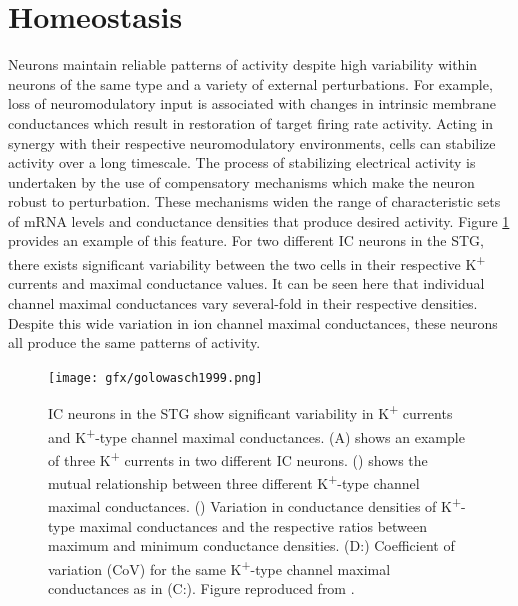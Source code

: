 \section{Homeostasis} %
Neurons maintain reliable patterns of activity despite high variability within neurons of the same type and a variety of external perturbations\cite{desai_plasticity_1999,golowasch_activity-dependent_1999,lemasson_activity-dependent_1993,turrigiano_activity-dependent_1994,turrigiano_selective_1995,turrigiano_homeostatic_1999,turrigiano_activity-dependent_1998}. For example, loss of neuromodulatory input is associated with changes in intrinsic membrane conductances which result in restoration of target firing rate activity\cite{turrigiano_activity-dependent_1994,turrigiano_selective_1995}.
Acting in synergy with their respective neuromodulatory environments, cells can stabilize activity over a long timescale\cite{franklin_long-term_1992,oleary_homeostasis_2010}.
The process of stabilizing electrical activity is undertaken by the use of compensatory mechanisms which make the neuron robust to perturbation. These mechanisms widen the range of characteristic sets of mRNA levels and conductance densities that produce desired activity\cite{rodgers_dopaminergic_2013,goldman_global_2001}.
Figure \ref{fig:golowasch1999} provides an example of this feature. For two different \ac{IC} neurons in the \acf{STG}, there exists significant variability between the two cells in their respective K\textsuperscript{+} currents and maximal conductance values. It can be seen here that individual channel maximal conductances vary several-fold in their respective densities. Despite this wide variation in ion channel maximal conductances, these neurons all produce the same patterns of activity.

\begin{figure}[h]
    \centering
    \texttt{[image: gfx/golowasch1999.png]}
\caption[Variation in K\textsuperscript{+} currents and K\textsuperscript{+}-type maximal conductances in neurons in the \ac{STG}.]{\ac{IC} neurons in the \ac{STG} show significant variability in K\textsuperscript{+} currents and K\textsuperscript{+}-type channel maximal conductances\cite{golowasch_activity-dependent_1999}. (\textsc{A}) shows an example of three K\textsuperscript{+} currents in two different \ac{IC} neurons. () shows the mutual relationship between three different K\textsuperscript{+}-type channel maximal conductances. () Variation in conductance densities of K\textsuperscript{+}-type maximal conductances and the respective ratios between maximum and minimum conductance densities. (\textsc{D:}) Coefficient of variation (CoV) for the same K\textsuperscript{+}-type channel maximal conductances as in (\textsc{C:}). Figure reproduced from \cite{golowasch_activity-dependent_1999}.}
    \label{fig:golowasch1999}
\end{figure}

